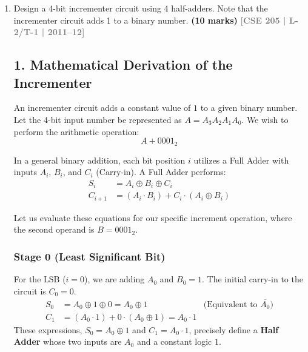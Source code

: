 \documentclass[12pt,a3paper]{article}
\newcommand{\yr}[1]{\hfill\textcolor{gray}{\small\textbf{[#1]}}}
\newcommand{\mk}[1]{\textcolor{orange!70!black}{\small\textbf{(#1 marks)}}}
\begin{document}
\begin{enumerate}
\begin{tcolorbox}[enhanced,breakable,ansbox,colback=cD!4,colframe=cD,boxrule=0.8pt,arc=5pt,title={\textbf{Answer}},fonttitle=\bfseries\color{white},colbacktitle=cD]
\end{tcolorbox}

\item Design a 4-bit incrementer circuit using 4 half-adders. Note that the incrementer circuit adds 1 to a binary number.
\mk{10} \yr{CSE 205 | L-2/T-1 | 2011--12}

\begin{tcolorbox}[enhanced,breakable,ansbox,colback=cD!4,colframe=cD,boxrule=0.8pt,arc=5pt,title={\textbf{Answer}},fonttitle=\bfseries\color{white},colbacktitle=cD]

\subsection*{1. Mathematical Derivation of the Incrementer}

An incrementer circuit adds a constant value of $1$ to a given binary number. Let the 4-bit input number be represented as $A = A_3 A_2 A_1 A_0$. We wish to perform the arithmetic operation:
\[ A + 0001_2 \]

In a general binary addition, each bit position $i$ utilizes a Full Adder with inputs $A_i$, $B_i$, and $C_i$ (Carry-in). A Full Adder performs:
\begin{align*}
    S_i &= A_i \oplus B_i \oplus C_i \\
    C_{i+1} &= (A_i \cdot B_i) + C_i \cdot (A_i \oplus B_i)
\end{align*}

Let us evaluate these equations for our specific increment operation, where the second operand is $B = 0001_2$. 

\subsubsection*{Stage 0 (Least Significant Bit)}
For the LSB ($i=0$), we are adding $A_0$ and $B_0 = 1$. The initial carry-in to the circuit is $C_0 = 0$.
\begin{align*}
    S_0 &= A_0 \oplus 1 \oplus 0 = A_0 \oplus 1 \quad &\text{(Equivalent to $\overline{A_0}$)} \\
    C_1 &= (A_0 \cdot 1) + 0 \cdot (A_0 \oplus 1) = A_0 \cdot 1
\end{align*}
These expressions, $S_0 = A_0 \oplus 1$ and $C_1 = A_0 \cdot 1$, precisely define a \textbf{Half Adder} whose two inputs are $A_0$ and a constant logic $1$.


\end{tcolorbox}
\end{enumerate}
\end{document}
